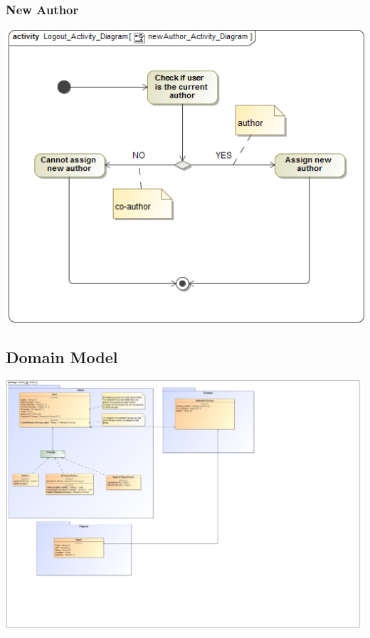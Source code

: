 \documentclass[11pt]{article}
\begin{document}
	\newpage
	\subsubsection{New Author}
	\begin{center}
		\includegraphics[width=\textwidth]{../Images/newAuthor_Activity_Diagram.png}\\[0.5cm]
	\end{center}
	
	\subsection{Domain Model}
	\begin{center}
		\includegraphics[width=\textwidth]{../Images/DomainModel.png}\\[0.5cm]
	\end{center}
	
\end{document}

